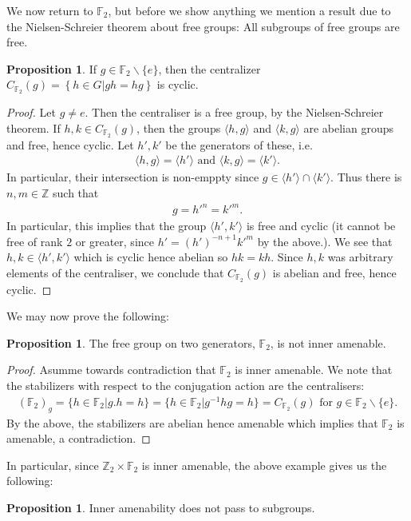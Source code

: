 \documentclass[10pt,oneside,openany,final]{memoir}
\theoremstyle{definition}
\newtheorem{proposition}[theorem]{Proposition}
\theoremstyle{Break}
\newcommand{\Z}{\mathbb{Z}}
\newcommand{\F}{\mathbb{F}}
\begin{document}
We now return to $\mathbb{F}_2$, but before we show anything we mention a result due to the Nielsen-Schreier theorem about free groups: All subgroups of free groups are free.
\begin{proposition}
	If $g \in \F_2 \backslash\{e\}$, then the centralizer $C_{\F_2}(g)=\left\{ h \in G | gh=hg \right\}$ is cyclic.
\end{proposition}
\begin{proof}
	Let $g \neq e$. Then the centraliser is a free group, by the Nielsen-Schreier theorem. If $h,k \in C_{\F_2}(g)$, then the groups $\langle h,g \rangle$ and $\langle k,g \rangle$ are abelian groups and free, hence cyclic. Let $h',k'$ be the generators of these, i.e.
	\begin{align*}
		\langle h,g \rangle = \langle h'\rangle \text{ and } \langle k,g \rangle = \langle k' \rangle.
	\end{align*}
	In particular, their intersection is non-emppty since $g \in \langle h'\rangle \cap \langle k'\rangle$. Thus there is $n,m \in \Z$ such that
	\begin{align*}
		g=h'^n=k'^m.
	\end{align*}
	In particular, this implies that the group $\langle h',k'\rangle$ is free and cyclic (it cannot be free of rank $2$ or greater, since $h'=(h')^{-n+1}k'^m$ by the above.). We see that $h, k \in \langle h',k'\rangle$ which is cyclic hence abelian so $hk=kh$. Since $h,k$ was arbitrary elements of the centraliser, we conclude that $C_{\F_2}(g)$ is abelian and free, hence cyclic.
\end{proof}
We may now prove the following:
\begin{proposition}
	The free group on two generators, $\F_2$, is not inner amenable.
\end{proposition}
\begin{proof}
	Asumme towards contradiction that $\F_2$ is inner amenable. We note that the stabilizers with respect to the conjugation action are the centralisers:
	\begin{align*}
		(\F_2)_g=\{h \in \F_2 | g.h = h\} = \{h \in \F_2 | g^{-1}hg=h\}= C_{\F_2}(g) \text{ for } g \in \F_2 \backslash\{e\}.
	\end{align*}
	By the above, the stabilizers are abelian hence amenable which implies that $\F_2$ is amenable, a contradiction. 
\end{proof}
In particular, since $\Z_2\times \F_2$ is inner amenable, the above example gives us the following:
\begin{proposition}
	Inner amenability does not pass to subgroups.
\end{proposition}
\end{document}

